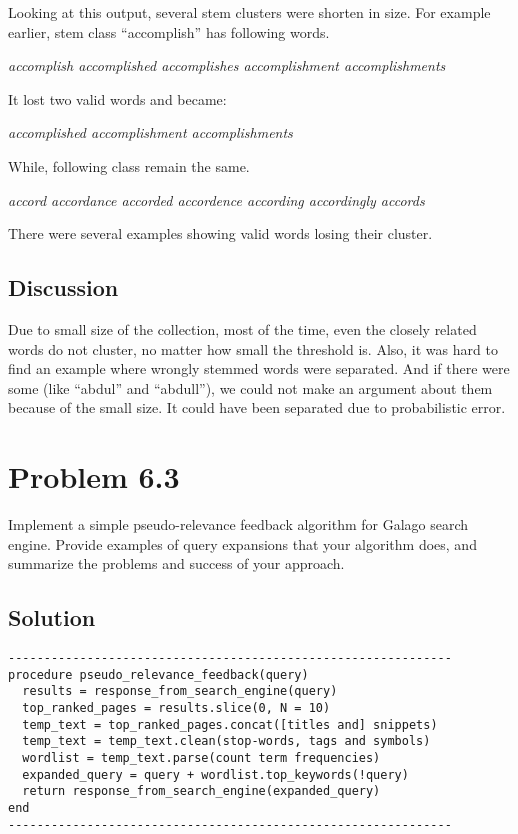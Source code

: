 \documentclass[letterpaper,12pt]{article}
\begin{document}
Looking at this output, several stem clusters were shorten in size. For example earlier, stem class ``accomplish'' has following words.

\emph{accomplish accomplished accomplishes accomplishment accomplishments}

It lost two valid words and became:

\emph{accomplished accomplishment accomplishments}

While, following class remain the same.

\emph{accord accordance accorded accordence according accordingly accords}

There were several examples showing valid words losing their cluster.


\subsection{Discussion}

Due to small size of the collection, most of the time, even the closely related words do not cluster, no matter how small the threshold is. Also, it was hard to find an example where wrongly stemmed words were separated. And if there were some (like ``abdul'' and ``abdull''), we could not make an argument about them because of the small size. It could have been separated due to probabilistic error.


\pagebreak


\section{Problem 6.3}

Implement a simple pseudo-relevance feedback algorithm for Galago search engine. Provide examples of query expansions that your algorithm does, and summarize the problems and success of your approach.


\subsection{Solution}

\begin{verbatim}
--------------------------------------------------------------
procedure pseudo_relevance_feedback(query)
  results = response_from_search_engine(query)
  top_ranked_pages = results.slice(0, N = 10)
  temp_text = top_ranked_pages.concat([titles and] snippets)
  temp_text = temp_text.clean(stop-words, tags and symbols)
  wordlist = temp_text.parse(count term frequencies)
  expanded_query = query + wordlist.top_keywords(!query)
  return response_from_search_engine(expanded_query)
end
--------------------------------------------------------------
\end{verbatim}
\end{document}
